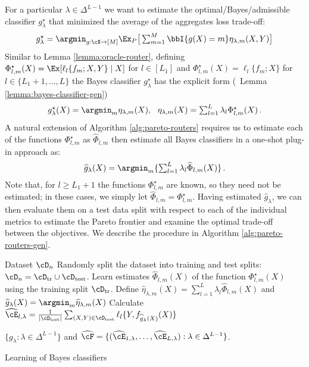 For a particular $\lambda \in \Delta^{L-1}$ we want to estimate the optimal/Bayes/admissible classifier $g_\lambda^\star$ that minimized the average of the aggregates loss trade-off:
\begin{equation}
    \textstyle g_\lambda^\star = \argmin_{g: \cX \to [M]}  \Ex_P\big[\sum_{m = 1}^M \bbI\{g(X) = m\} \eta_{\lambda, m} (X, Y) \big ]
\end{equation}
Similar to Lemma \ref{lemma:oracle-router}, defining $\Phi_{l, m}^\star(X) = \Ex[\ell_l\{f_m; X,Y\} \mid X]$ for $l \in [L_1]$ and $\Phi_{l, m}^\star(X) = \ell_l\{f_m; X\} $ for $l \in \{L_1 + 1, \dots, L\}$ the Bayes classifier $g_\lambda^\star$ has the explicit form  (\cf\ Lemma \ref{lemma:bayes-classifier-gen})
\begin{equation}\label{eq:oracle-router-gen}
  \textstyle  g_\lambda^\star (X) = \argmin_m  \eta_{\lambda, m}(X), ~~ \eta_{\lambda, m}(X) = \sum_{l = 1}^L \lambda_l \Phi_{l, m}^\star (X)\,.
\end{equation}
A natural extension of Algorithm \ref{alg:pareto-routers} requires us to estimate each of the functions $\Phi_{l, m}^\star$ as $\widehat \Phi_{l, m}$ then estimate all Bayes classifiers in a one-shot plug-in approach as:
\[
\textstyle \widehat g_\lambda(X) = \argmin_m  \{\sum_{l = 1}^L \lambda_l \widehat \Phi_{l, m} (X) \}\,.
\] 
Note that, for $l \ge L_1+ 1$ the functions $\Phi_{l, m}^\star$ are known, so they need not be estimated; in these cases, we simply let $\widehat \Phi_{l, m} = \Phi_{l ,m}^\star$. 
Having estimated $\widehat g_\lambda$, we can then evaluate them on a test data split with respect to each of the individual metrics to estimate the Pareto frontier and examine the optimal trade-off between the objectives.
We describe the procedure in Algorithm \ref{alg:pareto-routers-gen}.  

\begin{algorithm}
    \begin{algorithmic}[1]
\Require Dataset $\cD_n$
\State Randomly split the dataset into training and test splits: $\cD_n = \cD_{\text{tr}} \cup \cD_{\text{test}}$. 
\State  Learn estimates $\widehat \Phi_{l, m} (X)$ of the function $\Phi_{l, m}^\star(X)$ using the training split $\cD_{\text{tr}}$. 
\State  Define $\widehat \eta_{\lambda, m}(X) =  \sum_{l = 1}^L \lambda_l \widehat \Phi_{l, m} (X)  $ and 
 $\widehat g_\lambda(X) = \argmin_m \widehat \eta_{\lambda, m}(X)$
 \State Calculate $\widehat \cE_{l, \lambda}  =  \frac1{|\cD_{\text{test}}|} \sum_{(X, Y) \in \cD_{\text{test}}}  \ell_l\{Y, f_{\widehat g_\lambda(X)}(X)\}$
 \EndFor
\EndFor

\Return $\{g_\lambda: \lambda \in \Delta^{L-1}\}$ and $\widehat\cF = \{(\widehat \cE_{1, \lambda}, \dots, \widehat \cE_{L, \lambda}): \lambda \in \Delta^{L-1}\}$. 
\end{algorithmic}
\caption{Learning of Bayes classifiers}
\label{alg:pareto-routers-gen}
\end{algorithm}



